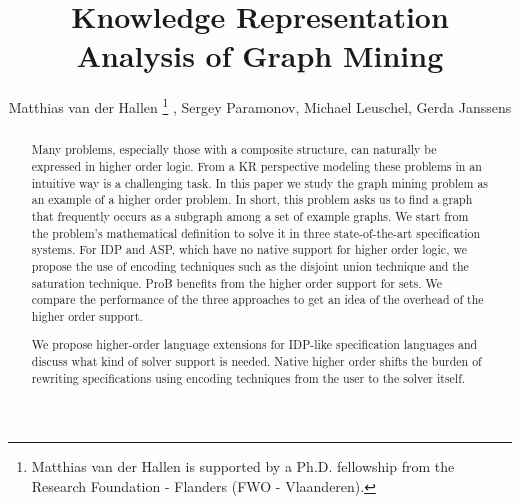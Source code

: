 \documentclass{llncs}
\author{Matthias van der Hallen\dag
\thanks{Matthias van der Hallen is supported by a Ph.D. fellowship from the Research Foundation - Flanders (FWO - Vlaanderen).\vspace{-3em}}
, Sergey Paramonov\dag, Michael Leuschel\ddag, Gerda Janssens\dag}
\title{Knowledge Representation Analysis of Graph Mining}
\institute{\dag KU Leuven, \ddag Heinrich-Heine-Universit\"at D\"usseldorf}
\begin{document}
\maketitle
\begin{abstract}
Many problems, especially those with a composite structure, can naturally be expressed in higher order logic. %
From a KR perspective modeling these problems in an intuitive way is a challenging task.
In this paper we study the graph mining problem as an example of a higher order problem. 
In short, this problem asks us to find a graph that frequently occurs as a subgraph among a set of example graphs.
We start from the problem's mathematical definition 
to solve it
in three state-of-the-art specification systems.
For IDP and ASP, which have no
native support for higher order logic, we propose the use of encoding
techniques such as the disjoint union technique and the saturation technique.
ProB
benefits
from the higher order support for sets.
We compare the performance of the three approaches to get an idea of
the overhead of the higher order support.

We propose higher-order language extensions for IDP-like
specification languages
and  discuss what kind of solver support is needed.
Native higher order shifts the burden of rewriting specifications using encoding techniques from the user to the solver itself.


\end{abstract}


%




%


{\scriptsize
}



\end{document}
